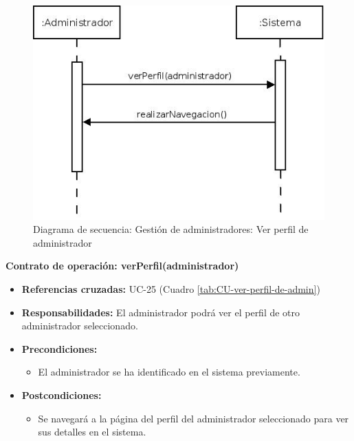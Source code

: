 \begin{figure}[h!]
\centering
  \includegraphics[scale=.55]{img/secuencias/gestion-administradores-ver-perfil.jpeg}
  \caption{Diagrama de secuencia: Gestión de administradores: Ver perfil de administrador}
  \label{fig:secuencia-gestion-administradores-ver-perfil}
\end{figure}

\textbf{Contrato de operación: verPerfil(administrador)}
\begin{itemize}
\item \textbf{Referencias cruzadas:} UC-25 (Cuadro \ref{tab:CU-ver-perfil-de-admin})
\item \textbf{Responsabilidades:} El administrador podrá ver el perfil de otro administrador seleccionado.
\item \textbf{Precondiciones:} 
 \begin{itemize}
\item El administrador se ha identificado en el sistema previamente.
\end {itemize}
\item \textbf{Postcondiciones:} 
 \begin{itemize}
\item Se navegará a la página del perfil del administrador seleccionado para ver sus detalles en el sistema.
\end {itemize}
\end {itemize}

